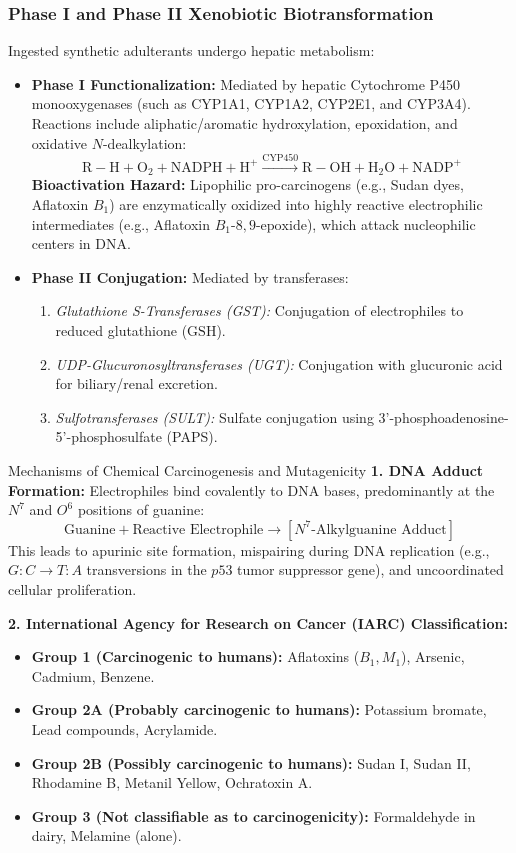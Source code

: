 \documentclass[11pt,a4paper,oneside]{article}
\begin{document}
\subsubsection{Phase I and Phase II Xenobiotic Biotransformation}
Ingested synthetic adulterants undergo hepatic metabolism:
\begin{itemize}[leftmargin=*]
    \item \textbf{Phase I Functionalization:} Mediated by hepatic Cytochrome P450 monooxygenases (such as CYP1A1, CYP1A2, CYP2E1, and CYP3A4). Reactions include aliphatic/aromatic hydroxylation, epoxidation, and oxidative $N$-dealkylation:
    $$\mathrm{R-H + O_2 + NADPH + H^+ \xrightarrow{CYP450} R-OH + H_2O + NADP^+}$$
    \textbf{Bioactivation Hazard:} Lipophilic pro-carcinogens (e.g., Sudan dyes, Aflatoxin $B_1$) are enzymatically oxidized into highly reactive electrophilic intermediates (e.g., Aflatoxin $B_1\text{-}8,9\text{-epoxide}$), which attack nucleophilic centers in DNA.
    \item \textbf{Phase II Conjugation:} Mediated by transferases:
    \begin{enumerate}
        \item \textit{Glutathione S-Transferases (GST):} Conjugation of electrophiles to reduced glutathione ($\mathrm{GSH}$).
        \item \textit{UDP-Glucuronosyltransferases (UGT):} Conjugation with glucuronic acid for biliary/renal excretion.
        \item \textit{Sulfotransferases (SULT):} Sulfate conjugation using 3'-phosphoadenosine-5'-phosphosulfate (PAPS).
    \end{enumerate}
\end{itemize}

\begin{hazardbox}{Mechanisms of Chemical Carcinogenesis and Mutagenicity}
\textbf{1. DNA Adduct Formation:} Electrophiles bind covalently to DNA bases, predominantly at the $N^7$ and $O^6$ positions of guanine:
$$\text{Guanine} + \text{Reactive Electrophile} \longrightarrow [N^7\text{-Alkylguanine Adduct}]$$
This leads to apurinic site formation, mispairing during DNA replication (e.g., $G:C \to T:A$ transversions in the $p53$ tumor suppressor gene), and uncoordinated cellular proliferation.

\textbf{2. International Agency for Research on Cancer (IARC) Classification:}
\begin{itemize}
    \item \textbf{Group 1 (Carcinogenic to humans):} Aflatoxins ($B_1, M_1$), Arsenic, Cadmium, Benzene.
    \item \textbf{Group 2A (Probably carcinogenic to humans):} Potassium bromate, Lead compounds, Acrylamide.
    \item \textbf{Group 2B (Possibly carcinogenic to humans):} Sudan I, Sudan II, Rhodamine B, Metanil Yellow, Ochratoxin A.
    \item \textbf{Group 3 (Not classifiable as to carcinogenicity):} Formaldehyde in dairy, Melamine (alone).
\end{itemize}
\end{hazardbox}
\end{document}
